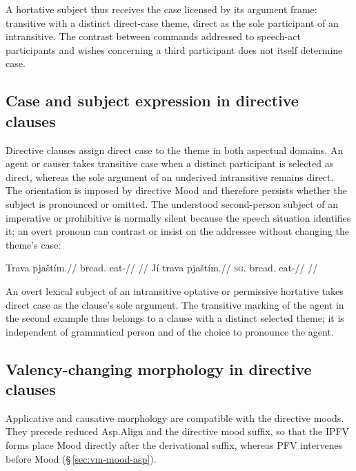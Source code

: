 \noindent A hortative subject thus receives the case licensed by its argument
frame: transitive with a distinct direct-case theme, direct as the sole
participant of an intransitive. The contrast between commands addressed to
speech-act participants and wishes concerning a third participant does not
itself determine case.

\subsection{Case and subject expression in directive clauses}\label{sec:mood-directive-case}

Directive clauses assign direct case to the theme in both aspectual domains.
An agent or causer takes transitive case when a distinct participant is selected
as direct, whereas the sole argument of an underived intransitive remains
direct. The orientation is imposed by directive Mood and therefore persists
whether the subject is pronounced or omitted. The understood second-person
subject of an imperative or prohibitive is normally silent because the speech
situation identifies it; an overt pronoun can contrast or insist on the
addressee without changing the theme's case:

\pex\label{ex:val-directive-simple}
\a
\begingl
\gla Trava pjaštím.//
\glb bread.\Dir{} eat-\Imp{}//
\glft {} //
\endgl
\a
\begingl
\gla Jí trava pjaštím.//
\textsc{sg}.\Trs{} bread.\Dir{} eat-\Imp{}//
\glft {} //
\endgl
\xe

\noindent An overt lexical subject of an intransitive optative or permissive
hortative takes direct case as the clause's sole argument. The transitive
marking of the agent in the second example thus belongs to a clause with a
distinct selected theme; it is independent of grammatical person and of the
choice to pronounce the agent.

\subsection{Valency-changing morphology in directive clauses}\label{sec:mood-directive-valency}

Applicative and causative morphology are compatible with the directive moods.
They precede reduced Asp.Align and the directive mood suffix, so that the
IPFV forms place Mood directly after the derivational suffix, whereas PFV
 intervenes before Mood (§\,\ref{sec:vm-mood-asp}).


